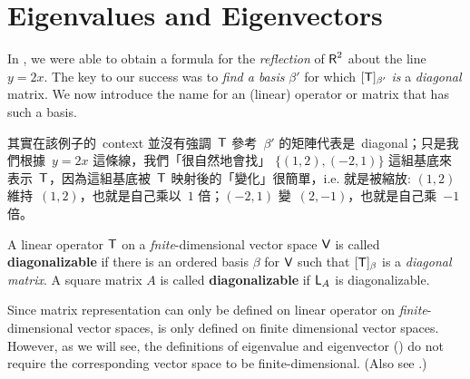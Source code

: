 \section{Eigenvalues and Eigenvectors} \label{sec 5.1}

In , we were able to obtain a formula for the \emph{reflection} of \(\textsf{R}^2\) about the line \(y = 2x\).
The key to our success was to \emph{find a basis} \(\beta'\) for which \([\textsf{T}]_{\beta'}\) \emph{is} a \emph{diagonal} matrix.
We now introduce the name for an (linear) operator or matrix that has such a basis.

\begin{note}
其實在該例子的\ context 並沒有強調\ \(\textsf{T}\) 參考\ \(\beta'\) 的矩陣代表是\ diagonal；只是我們根據\ \(y = 2x\) 這條線，我們「很自然地會找」 \(\{ (1,2), (-2, 1) \}\) 這組基底來表示\ \(\textsf{T}\)，因為這組基底被\ \(\textsf{T}\) 映射後的「變化」很簡單，i.e. 就是被縮放: \((1,2)\) 維持\ \((1,2)\)，也就是自己乘以\ \(1\) 倍；\((-2,1)\) 變\ \((2,-1)\)，也就是自己乘\ \(-1\) 倍。
\end{note}

\begin{definition} \label{def 5.1}
A linear operator \(\textsf{T}\) on a \emph{fnite}-dimensional vector space \(\textsf{V}\) is called \textbf{diagonalizable} if there is an ordered basis \(\beta\) for \(\textsf{V}\) such that \([\textsf{T}]_{\beta}\) is a \emph{diagonal matrix}.
A square matrix \(A\) is called \textbf{diagonalizable} if \(\textsf{L}_A\) is diagonalizable.
\end{definition}

\begin{remark} \label{remark 5.1.1}
\sloppy Since matrix representation can only be defined on linear operator on \emph{finite}-dimensional vector spaces,
 is only defined on finite dimensional vector spaces.
However, as we will see, the definitions of eigenvalue and eigenvector () do not require the corresponding vector space to be finite-dimensional.
(Also see .)
\end{remark}

